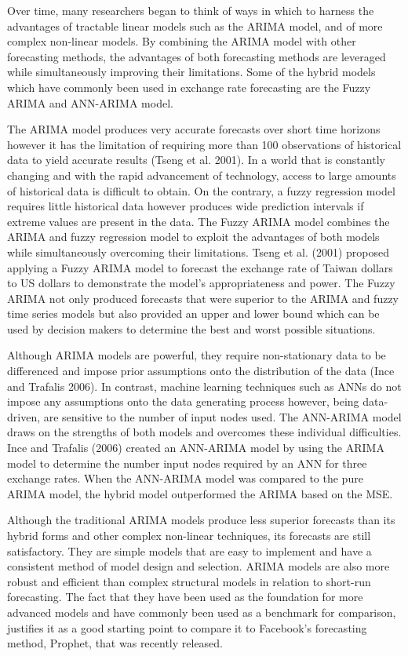 \documentclass[12pt,a4paper]{article}
\numberwithin{equation}{section}
\numberwithin{figure}{section}
\numberwithin{table}{section}
\begin{document}
Over time, many researchers began to think of ways in which to harness
the advantages of tractable linear models such as the ARIMA model, and
of more complex non-linear models. By combining the ARIMA model with
other forecasting methods, the advantages of both forecasting methods
are leveraged while simultaneously improving their limitations. Some of
the hybrid models which have commonly been used in exchange rate
forecasting are the Fuzzy ARIMA and ANN-ARIMA model.

The ARIMA model produces very accurate forecasts over short time
horizons however it has the limitation of requiring more than 100
observations of historical data to yield accurate results (Tseng et al.
2001). In a world that is constantly changing and with the rapid
advancement of technology, access to large amounts of historical data is
difficult to obtain. On the contrary, a fuzzy regression model requires
little historical data however produces wide prediction intervals if
extreme values are present in the data. The Fuzzy ARIMA model combines
the ARIMA and fuzzy regression model to exploit the advantages of both
models while simultaneously overcoming their limitations. Tseng et al.
(2001) proposed applying a Fuzzy ARIMA model to forecast the exchange
rate of Taiwan dollars to US dollars to demonstrate the model's
appropriateness and power. The Fuzzy ARIMA not only produced forecasts
that were superior to the ARIMA and fuzzy time series models but also
provided an upper and lower bound which can be used by decision makers
to determine the best and worst possible situations.

Although ARIMA models are powerful, they require non-stationary data to
be differenced and impose prior assumptions onto the distribution of the
data (Ince and Trafalis 2006). In contrast, machine learning techniques
such as ANNs do not impose any assumptions onto the data generating
process however, being data-driven, are sensitive to the number of input
nodes used. The ANN-ARIMA model draws on the strengths of both models
and overcomes these individual difficulties. Ince and Trafalis (2006)
created an ANN-ARIMA model by using the ARIMA model to determine the
number input nodes required by an ANN for three exchange rates. When the
ANN-ARIMA model was compared to the pure ARIMA model, the hybrid model
outperformed the ARIMA based on the MSE.

Although the traditional ARIMA models produce less superior forecasts
than its hybrid forms and other complex non-linear techniques, its
forecasts are still satisfactory. They are simple models that are easy
to implement and have a consistent method of model design and selection.
ARIMA models are also more robust and efficient than complex structural
models in relation to short-run forecasting. The fact that they have
been used as the foundation for more advanced models and have commonly
been used as a benchmark for comparison, justifies it as a good starting
point to compare it to Facebook's forecasting method, Prophet, that was
recently released.
\end{document}
